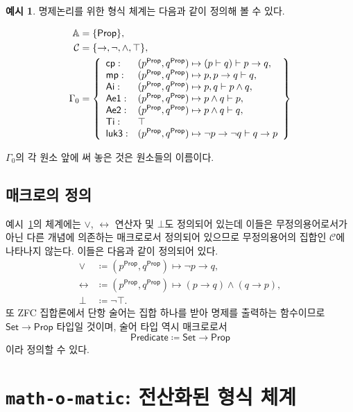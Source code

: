 \documentclass[10pt,twocolumn]{article}
\theoremstyle{definition}
\newtheorem{example}[theorem]{예시}
\newcommand{\Prop}{\mathsf{Prop}}
\newcommand{\Set}{\mathsf{Set}}
\begin{document}
\begin{example}\label{example:system}
	명제논리를 위한 형식 체계는 다음과 같이 정의해 볼 수 있다.
	
	\begin{align*}
		\mathbb A &= \{\mathsf{Prop}\}, \\
		\mathcal C &= \{\to, \neg, \land, \top\}, \\
		\Gamma_0 &= \left\{\begin{array}{l l}
			\mathsf{cp}: & (p^\Prop, q^\Prop)\mapsto(p\vdash q)\vdash p\to q, \\
			\mathsf{mp}: & (p^\Prop, q^\Prop)\mapsto p, p\to q\vdash q, \\
			\mathsf{Ai}: & (p^\Prop, q^\Prop)\mapsto p, q\vdash p\land q, \\
			\mathsf{Ae1}: & (p^\Prop, q^\Prop)\mapsto p\land q\vdash p, \\
			\mathsf{Ae2}: & (p^\Prop, q^\Prop)\mapsto p\land q\vdash q, \\
			\mathsf{Ti}: & \top \\
			\mathsf{luk3}: & (p^\Prop, q^\Prop)\mapsto \neg p\to\neg q\vdash q\to p
		\end{array}\right\}
	\end{align*}

	$\Gamma_0$의 각 원소 앞에 써 놓은 것은 원소들의 이름이다.
\end{example}

\subsection{매크로의 정의}

예시~\ref{example:system}의 체계에는 $\lor$, $\leftrightarrow$ 연산자 및 $\bot$도 정의되어 있는데 이들은 무정의용어로서가 아닌 다른 개념에 의존하는 매크로로서 정의되어 있으므로 무정의용어의 집합인 $\mathcal C$에 나타나지 않는다. 이들은 다음과 같이 정의되어 있다.
\begin{align*}
	\lor&\coloneqq (p^\Prop, q^\Prop)\mapsto \neg p\to q, \\
	\leftrightarrow&\coloneqq (p^\Prop, q^\Prop)\mapsto (p\to q)\land(q\to p), \\
	\bot&\coloneqq\neg\top.
\end{align*}
또 ZFC 집합론에서 단항 술어는 집합 하나를 받아 명제를 출력하는 함수이므로 $\Set\to\Prop$ 타입일 것이며, 술어 타입 역시 매크로로서
$$\mathsf{Predicate}\coloneqq\Set\to\Prop$$
이라 정의할 수 있다.

\section{\texttt{math-o-matic}: 전산화된 형식 체계}
\end{document}
